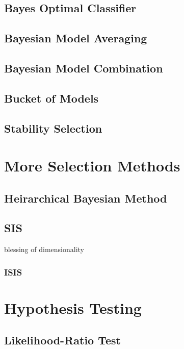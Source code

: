 \subsection{Bayes Optimal Classifier}
\subsection{Bayesian Model Averaging}
\subsection{Bayesian Model Combination}
\subsection{Bucket of Models}
\subsection{Stability Selection}

\section{More Selection Methods}

\subsection{Heirarchical Bayesian Method} 

\subsection{SIS}
blessing of dimensionality 
\subsubsection{ISIS}

\section{Hypothesis Testing}
\subsection{Likelihood-Ratio Test}
